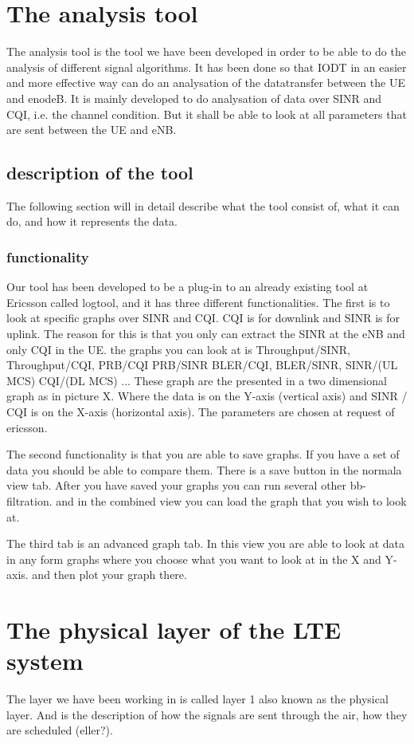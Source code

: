 \documentclass[cropmarks, frame, english]{idamasterthesis}
\begin{document}
\chapter{The analysis tool}
The analysis tool is the tool we have been developed in order to be able to do the analysis of different signal algorithms. It has been done so that IODT in an easier and more effective way can do an analysation of the datatransfer between the UE and enodeB. It is mainly developed to do analysation of data over SINR and CQI, i.e. the channel condition. But it shall be able to look at all parameters that are sent between the UE and eNB. 
\section{description of the tool}
The following section will in detail describe what the tool consist of, what it can do, and how it represents the data.
\subsection{functionality}
Our tool has been developed to be a plug-in to an already existing tool at Ericsson called logtool, and it has three different functionalities. The first is to look at specific graphs over SINR and CQI. CQI is for downlink and SINR is for uplink. The reason for this is that you only can extract the SINR at the eNB and only CQI in the UE. the graphs you can look at is Throughput/SINR, Throughput/CQI, PRB/CQI PRB/SINR BLER/CQI, BLER/SINR, SINR/(UL MCS) CQI/(DL MCS) ... These graph are the presented in a two dimensional graph as in picture X. Where the data is on the Y-axis (vertical axis) and SINR / CQI is on the X-axis (horizontal axis). The parameters are chosen at request of ericsson. 

The second functionality is that you are able to save graphs. If you have a set of data you should be able to compare them. There is a save button in the normala view tab. After you have saved your graphs you can run several other bb-filtration. and in the combined view you can load the graph that you wish to look at.

The third tab is an advanced graph tab. In this view you are able to look at data in any form graphs where you choose what you want to look at in the X and Y-axis. and then plot your graph there.
\chapter{The physical layer of the LTE system}
The layer we have been working in is called layer 1 also known as the physical layer. And is the description of how the signals are sent through the air, how they are scheduled (eller?).
 
\end{document}
